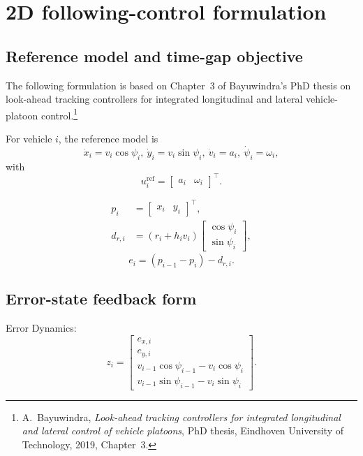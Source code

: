 \documentclass[11pt,a4paper]{article}
\begin{document}
\section{2D following-control formulation}

\subsection{Reference model and time-gap objective}
The following formulation is based on Chapter~3 of Bayuwindra's PhD thesis on look-ahead tracking controllers for integrated longitudinal and lateral vehicle-platoon control.\footnote{A.~Bayuwindra, \emph{Look-ahead tracking controllers for integrated longitudinal and lateral control of vehicle platoons}, PhD thesis, Eindhoven University of Technology, 2019, Chapter~3.}

For vehicle $i$, the reference model is
\begin{equation}
\dot{x}_i=v_i\cos\psi_i,\ 
\dot{y}_i=v_i\sin\psi_i,\ 
\dot{v}_i=a_i,\ 
\dot{\psi}_i=\omega_i,
\label{eq:unicycle-model}
\end{equation}
with
\begin{equation}
u_i^{\mathrm{ref}}=
\begin{bmatrix}a_i&\omega_i\end{bmatrix}^{\top}.
\label{eq:unicycle-input}
\end{equation}

\begin{equation}
\begin{aligned}
p_i&=\begin{bmatrix}x_i&y_i\end{bmatrix}^{\top},\\
d_{r,i}&=(r_i+h_iv_i)
\begin{bmatrix}\cos\psi_i\\\sin\psi_i\end{bmatrix},
\end{aligned}
\label{eq:time-gap-distance}
\end{equation}
\begin{equation}
e_i=(p_{i-1}-p_i)-d_{r,i}.
\label{eq:spacing-error}
\end{equation}

\subsection{Error-state feedback form}
Error Dynamics:
\begin{equation}
z_i=
\begin{bmatrix}
e_{x,i}\\ e_{y,i}\\
v_{i-1}\cos\psi_{i-1}-v_i\cos\psi_i\\
v_{i-1}\sin\psi_{i-1}-v_i\sin\psi_i
\end{bmatrix}.
\label{eq:error-state}
\end{equation}
\end{document}
